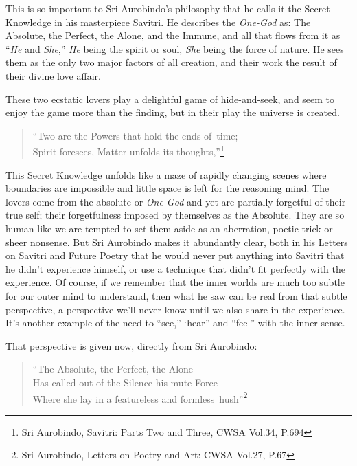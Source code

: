 \documentclass[12pt,a4paper]{book}
\begin{document}
This is so important to Sri Aurobindo's philosophy that he calls it
the Secret Knowledge in his masterpiece Savitri. He describes the
\emph{One-God} as: The Absolute, the Perfect, the Alone, and the
Immune, and all that flows from it as ``\emph{He} and \emph{She},''
\emph{He} being the spirit or soul, \emph{She} being the force of
nature. He sees them as the only two major factors of all creation,
and their work the result of their divine love affair.

These two ecstatic lovers play a delightful game of hide-and-seek, and
seem to enjoy the game more than the finding, but in their play the
universe is created.

\begin{verse}
``Two are the Powers that hold the ends of~time;\\ Spirit foresees,
  Matter unfolds its thoughts,''\footnote{Sri Aurobindo, Savitri:
    Parts Two and Three, CWSA Vol.34, P.694}
\end{verse}

This Secret Knowledge unfolds like a maze of rapidly changing scenes
where boundaries are impossible and little space is left for the
reasoning mind. The lovers come from the absolute or \emph{One-God}
and yet are partially forgetful of their true self; their
forgetfulness imposed by themselves as the Absolute. They are so
human-like we are tempted to set them aside as an aberration, poetic
trick or sheer nonsense. But Sri Aurobindo makes it abundantly clear,
both in his Letters on Savitri and Future Poetry that he would never
put anything into Savitri that he didn't experience himself, or use a
technique that didn't fit perfectly with the experience. Of course, if
we remember that the inner worlds are much too subtle for our outer
mind to understand, then what he saw can be real from that subtle
perspective, a perspective we'll never know until we also share in the
experience. It's another example of the need to ``see,'' ‘hear'' and
``feel'' with the inner sense.

\noindent That perspective is given now, directly from Sri Aurobindo:

\newpage
\begin{verse}
``The Absolute, the Perfect, the Alone\\
Has called out of the Silence his mute Force\\
Where she lay in a featureless and formless~hush''\footnote{Sri Aurobindo, Letters on Poetry and Art: CWSA Vol.27, P.67}
\end{verse}
\end{document}
